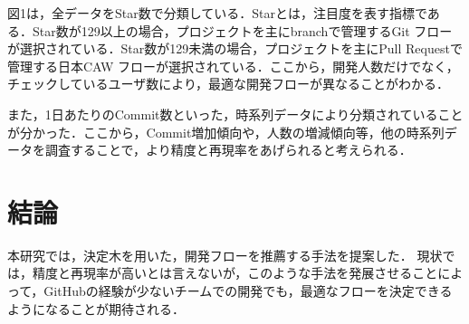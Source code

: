 \documentclass[uplatex,twocolumn]{jsarticle}
\begin{document}
図1は，全データをStar数で分類している．Starとは，注目度を表す指標である．Star数が129以上の場合，プロジェクトを主にbranchで管理するGit フローが選択されている．Star数が129未満の場合，プロジェクトを主にPull Requestで管理する日本CAW フローが選択されている．ここから，開発人数だけでなく，チェックしているユーザ数により，最適な開発フローが異なることがわかる．

また，1日あたりのCommit数といった，時系列データにより分類されていることが分かった．ここから，Commit増加傾向や，人数の増減傾向等，他の時系列データを調査することで，より精度と再現率をあげられると考えられる．



\section{結論}

本研究では，決定木を用いた，開発フローを推薦する手法を提案した．
現状では，精度と再現率が高いとは言えないが，このような手法を発展させることによって，GitHubの経験が少ないチームでの開発でも，最適なフローを決定できるようになることが期待される．


\end{document}
